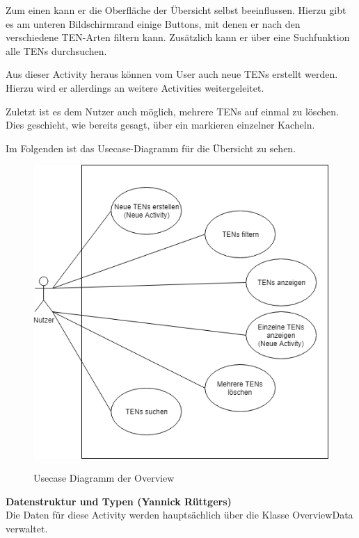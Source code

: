 Zum einen kann er die Oberfläche der Übersicht selbst beeinflussen. Hierzu gibt es am unteren Bildschirmrand einige Buttons, mit denen er nach den verschiedene TEN-Arten filtern kann. Zusätzlich kann er über eine Suchfunktion alle TENs durchsuchen.

Aus dieser Activity heraus können vom User auch neue TENs erstellt werden. Hierzu wird er allerdings an weitere Activities weitergeleitet.

Zuletzt ist es dem Nutzer auch möglich, mehrere TENs auf einmal zu löschen. Dies geschieht, wie bereits gesagt, über ein markieren einzelner Kacheln.

Im Folgenden ist das Usecase-Diagramm für die Übersicht zu sehen.

\begin{figure}[H]
\centering
\begin{minipage}[t]{1\textwidth} %
\caption{Usecase Diagramm der Overview} %
\includegraphics[width=1\textwidth]{img/Usecase_Overview}\\ %
\end{minipage}
\end{figure}

\textbf{Datenstruktur und Typen (Yannick Rüttgers)}\\
Die Daten für diese Activity werden hauptsächlich über die Klasse OverviewData verwaltet.

